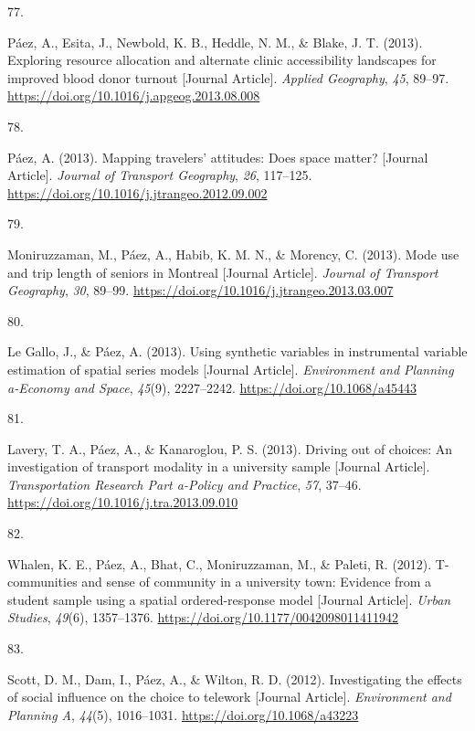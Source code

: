 \documentclass[11pt,a4paper,]{awesome-cv}
\newlength{\cslhangindent}
\newlength{\csllabelwidth}
\newenvironment{CSLReferences}[2] %
 {\begin{list}{}{%
  \setlength{\itemindent}{0pt}
  \setlength{\leftmargin}{0pt}
  \setlength{\parsep}{0pt}
  \ifodd #1
   \setlength{\leftmargin}{\cslhangindent}
   \setlength{\itemindent}{-1\cslhangindent}
  \fi
  \setlength{\itemsep}{#2\baselineskip}}}
 {\end{list}}
\newcommand{\CSLLeftMargin}[1]{\parbox[t]{\csllabelwidth}{\strut#1\strut}}
\newcommand{\CSLRightInline}[1]{\parbox[t]{\linewidth - \csllabelwidth}{\strut#1\strut}}
\begin{document}
\begin{CSLReferences}{0}{0}
\CSLLeftMargin{77. }%
\CSLRightInline{Páez, A., Esita, J., Newbold, K. B., Heddle, N. M., \&
Blake, J. T. (2013). Exploring resource allocation and alternate clinic
accessibility landscapes for improved blood donor turnout {[}Journal
Article{]}. \emph{Applied Geography}, \emph{45}, 89--97.
\url{https://doi.org/10.1016/j.apgeog.2013.08.008}}

\CSLLeftMargin{78. }%
\CSLRightInline{Páez, A. (2013). Mapping travelers' attitudes: Does
space matter? {[}Journal Article{]}. \emph{Journal of Transport
Geography}, \emph{26}, 117--125.
\url{https://doi.org/10.1016/j.jtrangeo.2012.09.002}}

\CSLLeftMargin{79. }%
\CSLRightInline{Moniruzzaman, M., Páez, A., Habib, K. M. N., \& Morency,
C. (2013). Mode use and trip length of seniors in Montreal {[}Journal
Article{]}. \emph{Journal of Transport Geography}, \emph{30}, 89--99.
\url{https://doi.org/10.1016/j.jtrangeo.2013.03.007}}

\CSLLeftMargin{80. }%
\CSLRightInline{Le Gallo, J., \& Páez, A. (2013). Using synthetic
variables in instrumental variable estimation of spatial series models
{[}Journal Article{]}. \emph{Environment and Planning a-Economy and
Space}, \emph{45}(9), 2227--2242. \url{https://doi.org/10.1068/a45443}}

\CSLLeftMargin{81. }%
\CSLRightInline{Lavery, T. A., Páez, A., \& Kanaroglou, P. S. (2013).
Driving out of choices: An investigation of transport modality in a
university sample {[}Journal Article{]}. \emph{Transportation Research
Part a-Policy and Practice}, \emph{57}, 37--46.
\url{https://doi.org/10.1016/j.tra.2013.09.010}}

\CSLLeftMargin{82. }%
\CSLRightInline{Whalen, K. E., Páez, A., Bhat, C., Moniruzzaman, M., \&
Paleti, R. (2012). T-communities and sense of community in a university
town: Evidence from a student sample using a spatial ordered-response
model {[}Journal Article{]}. \emph{Urban Studies}, \emph{49}(6),
1357--1376. \url{https://doi.org/10.1177/0042098011411942}}

\CSLLeftMargin{83. }%
\CSLRightInline{Scott, D. M., Dam, I., Páez, A., \& Wilton, R. D.
(2012). Investigating the effects of social influence on the choice to
telework {[}Journal Article{]}. \emph{Environment and Planning A},
\emph{44}(5), 1016--1031. \url{https://doi.org/10.1068/a43223}}


\end{CSLReferences}
\end{document}
